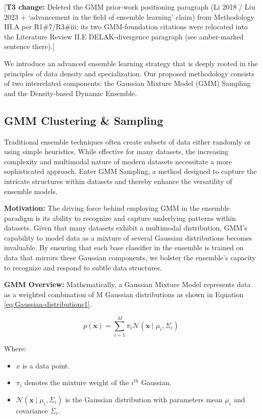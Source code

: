 \documentclass[lettersize,journal]{IEEEtran}
\newcommand{\tnote}[1]{\textcolor{tier3note}{\footnotesize[\textbf{T3 change:} #1]}}
\begin{document}
		\tnote{Deleted the GMM prior-work positioning paragraph (Li 2018 / Liu 2023 + `advancement in the field of ensemble learning' claim) from Methodology III.A per R1\#7/R3\#iii; its two GMM-foundation citations were relocated into the Literature Review II.E DELAK-divergence paragraph (see amber-marked sentence there).}
	
	We introduce an advanced ensemble learning strategy that is deeply rooted
	in the principles of data density and specialization. Our proposed methodology consists of two interrelated components: the Gaussian Mixture Model
	(GMM) Sampling and the Density-based Dynamic Ensemble.
	
	\subsection{GMM Clustering \& Sampling}
	\noindent Traditional ensemble techniques often create subsets of data either randomly or using simple heuristics. While effective for many datasets, the
	increasing complexity and multimodal nature of modern datasets necessitate
	a more sophisticated approach. Enter GMM Sampling, a method designed to capture the intricate structures within datasets
	and thereby enhance the versatility of ensemble models.
	
	\textbf{Motivation:} The driving force behind employing GMM in the ensemble paradigm is its ability to recognize and capture underlying patterns
	within datasets. Given that many datasets exhibit a multimodal distribution,
	GMM’s capability to model data as a mixture of several Gaussian distributions becomes invaluable. By ensuring that each base classifier in the ensemble is trained on data that mirrors these Gaussian components, we bolster
	the ensemble’s capacity to recognize and respond to subtle data structures.
	
	\textbf{GMM Overview:}
	Mathematically, a Gaussian Mixture Model represents data as a weighted combination of M Gaussian distributions as shown in Equation \ref{eq:Gaussian-distributions1}.
	
	\begin{equation}
		\label{eq:Gaussian-distributions1}
		p(\mathbf{x})=\sum_{i=1}^M \pi_i \mathcal{N}\left(\mathbf{x} \mid \mu_i, \Sigma_i\right)
	\end{equation}
	
	Where:
	\begin{itemize}
		\item $x$ is a data point.
		\item $\pi_i$ denotes the mixture weight of the $i^{{th }}$ Gaussian.
		\item $\mathcal{N}\left(\mathbf{x} \mid \mu_i, \Sigma_i\right)$ is the Gaussian distribution with parameters mean $\mu_i$ and covariance ${\Sigma}_i$.
	\end{itemize}
	
\end{document}
